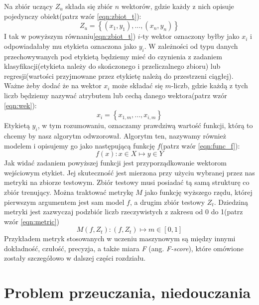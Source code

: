 Na zbiór uczący $Z_{u}$ składa się zbiór $n$ wektorów, gdzie każdy z nich opisuje pojedynczy obiekt(patrz wzór \ref{eqn:zbiot_t}):
\begin{equation}
	Z_{u}=\left \{(x_{1},y_{1}),...,(x_{n},y_{n})\right \}
	\label{eqn:zbiot_t}
\end{equation}
I tak w powyższym równaniu\ref{eqn:zbiot_t}) $i$-ty wektor oznaczony byłby jako $x_{i}$ i odpowiadałaby mu etykieta oznaczona jako $y_{i}$. W zależności od typu danych przechowywanych pod etykietą będziemy mieć do czynienia z zadaniem klasyfikacji(etykieta należy do skończonego i przeliczalnego zbioru) lub regresji(wartości przyjmowane przez etykietę należą do przestrzeni ciągłej). Ważne żeby dodać że na wektor $x_{i}$ może składać się $m$-liczb, gdzie każdą z tych liczb będziemy nazywać atrybutem lub cechą danego wektora(patrz wzór \ref{eqn:wek}):
\begin{equation}
	x_{i} = \left \{ x_{1,m}, ..., x_{i,m} \right \}
	\label{eqn:wek}
\end{equation}
Etykietą $y_{i}$, w tym rozumowaniu, oznaczamy prawdziwą wartość funkcji, którą to chcemy by nasz algorytm odwzorował. Algorytm ten, nazywamy również modelem i opisujemy go jako następującą funkcję $f$(patrz wzór \ref{eqn:func_f}):
\begin{equation}
	f(x): x \in X \mapsto y \in Y
	\label{eqn:func_f}
\end{equation}
Jak widać zadaniem powyższej funkcji jest przyporządkowanie wektorom wejściowym etykiet. Jej skuteczność jest mierzona przy użyciu wybranej przez nas metryki na zbiorze testowym. Zbiór testowy musi posiadać tą samą strukturę co zbiór trenujący. Można traktować metrykę $M$ jako funkcję wyższego rzędu, której pierwszym argumentem jest sam model $f$, a drugim zbiór testowy $Z_{t}$. Dziedziną metryki jest zazwyczaj podzbiór liczb rzeczywistych z zakresu od 0 do 1(patrz wzór \ref{eqn:metric})
\begin{equation}
	M(f, Z_{t}): (f, Z_{t}) \mapsto m \in [0, 1]
	\label{eqn:metric}
\end{equation}
Przykładem metryk stosowanych w uczeniu maszynowym są między innymi dokładność, czułość, precyzja, a także miara \textit{F} (ang. \textit{F-score}), które
omówione zostały szczegółowo w dalszej części rozdziału.
\\

\section{Problem przeuczania, niedouczania}

